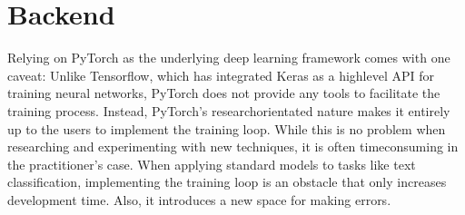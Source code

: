 \documentclass[letterpaper,10pt,english]{jupyterBook}
\begin{document}
\section{\sphinxhyphen{}Backend}
\label{\detokenize{HuggingfaceEcosystem:pytorch-backend}}
\sphinxAtStartPar
Relying on PyTorch as the underlying deep learning framework comes with one caveat: Unlike Tensorflow, which has integrated Keras as a high\sphinxhyphen{}level API for training neural networks, PyTorch does not provide any tools to facilitate the training process.
Instead, PyTorch’s research\sphinxhyphen{}orientated nature makes it entirely up to the users to implement the training loop. While this is no problem when researching and experimenting with new techniques, it is often time\sphinxhyphen{}consuming in the practitioner’s case.
When applying standard models to tasks like text classification, implementing the training loop is an obstacle that only increases development time. Also, it introduces a new space for making errors.
\end{document}
